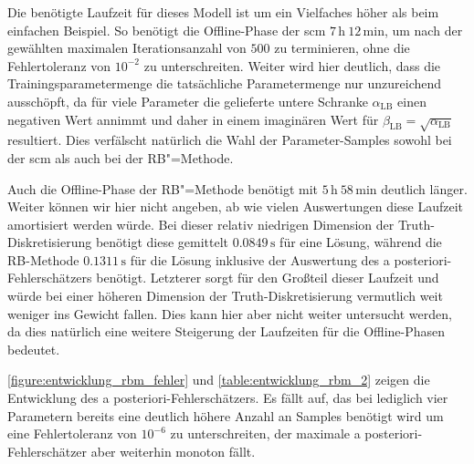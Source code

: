 \documentclass[../main.tex]{subfiles}
\begin{document}
Die benötigte Laufzeit für dieses Modell ist um ein Vielfaches höher als beim einfachen Beispiel.
So benötigt die Offline-Phase der \ac{scm} $7\,\mathrm{h}~12\,\mathrm{min}$, um nach der gewählten maximalen Iterationsanzahl von $500$ zu terminieren, ohne die Fehlertoleranz von $10^{-2}$ zu unterschreiten.
Weiter wird hier deutlich, dass die Trainingsparametermenge die tatsächliche Parametermenge nur unzureichend ausschöpft, da für viele Parameter die gelieferte untere Schranke $\alpha_{\mathrm{LB}}$ einen negativen Wert annimmt und daher in einem imaginären Wert für $\beta_{\mathrm{LB}} = \sqrt{\alpha_{\mathrm{LB}}}$ resultiert.
Dies verfälscht natürlich die Wahl der Parameter-Samples sowohl bei der \ac{scm} als auch bei der RB"=Methode.

Auch die Offline-Phase der RB"=Methode benötigt mit $5\,\mathrm{h}~58\,\mathrm{min}$ deutlich länger.
Weiter können wir hier nicht angeben, ab wie vielen Auswertungen diese Laufzeit amortisiert werden würde.
Bei dieser relativ niedrigen Dimension der Truth-Diskretisierung benötigt diese gemittelt $0.0849\,\mathrm{s}$ für eine Lösung, während die RB-Methode $0.1311\,\mathrm{s}$ für die Lösung inklusive der Auswertung des a posteriori-Fehlerschätzers benötigt.
Letzterer sorgt für den Großteil dieser Laufzeit und würde bei einer höheren Dimension der Truth-Diskretisierung vermutlich weit weniger ins Gewicht fallen.
Dies kann hier aber nicht weiter untersucht werden, da dies natürlich eine weitere Steigerung der Laufzeiten für die Offline-Phasen bedeutet.

\cref{figure:entwicklung_rbm_fehler} und \cref{table:entwicklung_rbm_2} zeigen die Entwicklung des a posteriori-Fehlerschätzers.
Es fällt auf, das bei lediglich vier Parametern bereits eine deutlich höhere Anzahl an Samples benötigt wird um eine Fehlertoleranz von $10^{-6}$ zu unterschreiten, der maximale a posteriori-Fehlerschätzer aber weiterhin monoton fällt.
\end{document}
